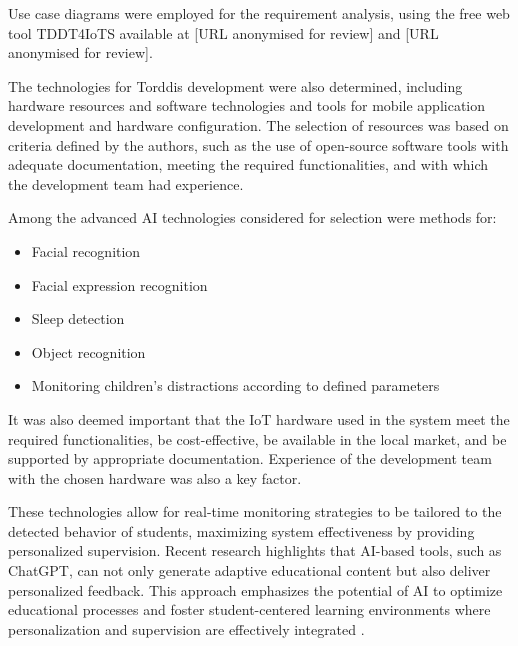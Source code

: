 				Use case diagrams were employed for the requirement analysis, using the free web tool TDDT4IoTS available at [URL anonymised for review] and [URL anonymised for review].
				
				
                The technologies for Torddis development were also determined, including hardware resources and software technologies and tools for mobile application development and hardware configuration. The selection of resources was based on criteria defined by the authors, such as the use of open-source software tools with adequate documentation, meeting the required functionalities, and with which the development team had experience.
                
                Among the advanced AI technologies considered for selection were methods for:
                
                \begin{itemize}
                    \item Facial recognition
                    
                    \item Facial expression recognition
                    
                    \item Sleep detection
                    
                    \item Object recognition
                    
                    \item Monitoring children’s distractions according to defined parameters
                \end{itemize}
                
                It was also deemed important that the IoT hardware used in the system meet the required functionalities, be cost-effective, be available in the local market, and be supported by appropriate documentation. Experience of the development team with the chosen hardware was also a key factor.
                
                These technologies allow for real-time monitoring strategies to be tailored to the detected behavior of students, maximizing system effectiveness by providing personalized supervision. Recent research highlights that AI-based tools, such as ChatGPT, can not only generate adaptive educational content but also deliver personalized feedback. This approach emphasizes the potential of AI to optimize educational processes and foster student-centered learning environments where personalization and supervision are effectively integrated \citep{Wang2025Development,Li2024Systematic}.
                
